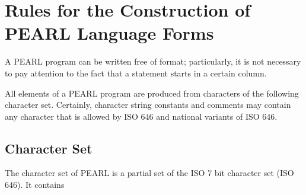 \chapter{Rules for the Construction of PEARL Language Forms}   %

A PEARL program can be written free of format; particularly, it is not
necessary to pay attention to the fact that a statement starts in a
certain column.

All elements of a PEARL program are produced from characters of the
following character set. Certainly, character string constants and
comments may contain any character that is allowed by ISO 646 and
national variants of ISO 646.

\section{Character Set}   %

The character set of PEARL is a partial set of the ISO 7 bit character
set (ISO 646). It contains

